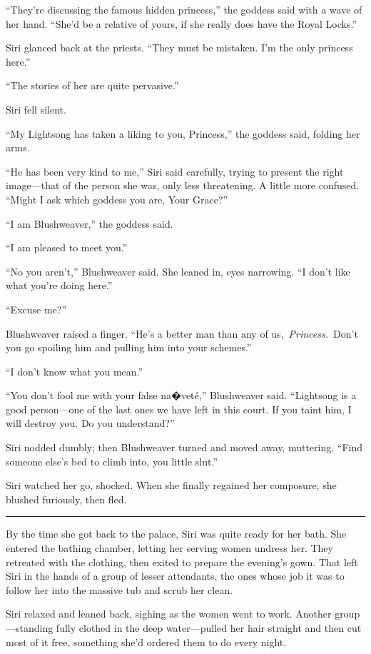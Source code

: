 “They’re discussing the famous hidden princess,” the goddess said with a wave of her hand. “She’d be a relative of yours, if she really does have the Royal Locks.”

Siri glanced back at the priests. “They must be mistaken. I’m the only princess here.”

“The stories of her are quite pervasive.”

Siri fell silent.

“My Lightsong has taken a liking to you, Princess,” the goddess said, folding her arms.

“He has been very kind to me,” Siri said carefully, trying to present the right image—that of the person she was, only less threatening. A little more confused. “Might I ask which goddess you are, Your Grace?”

“I am Blushweaver,” the goddess said.

“I am pleased to meet you.”

“No you aren’t,” Blushweaver said. She leaned in, eyes narrowing. “I don’t like what you’re doing here.”

“Excuse me?”

Blushweaver raised a finger. “He’s a better man than any of us,~\textit{Princess.}~Don’t you go spoiling him and pulling him into your schemes.”

“I don’t know what you mean.”

“You don’t fool me with your false na�veté,” Blushweaver said. “Lightsong is a good person—one of the last ones we have left in this court. If you taint him, I will destroy you. Do you understand?”

Siri nodded dumbly; then Blushweaver turned and moved away, muttering, “Find someone else’s bed to climb into, you little slut.”

Siri watched her go, shocked. When she finally regained her composure, she blushed furiously, then fled.

\bigskip \hrule \bigskip

By the time she got back to the palace, Siri was quite ready for her bath. She entered the bathing chamber, letting her serving women undress her. They retreated with the clothing, then exited to prepare the evening’s gown. That left Siri in the hands of a group of lesser attendants, the ones whose job it was to follow her into the massive tub and scrub her clean.

Siri relaxed and leaned back, sighing as the women went to work. Another group—standing fully clothed in the deep water—pulled her hair straight and then cut most of it free, something she’d ordered them to do every night.

